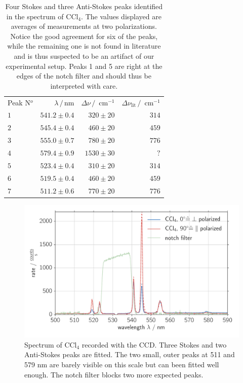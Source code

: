 \begin{table}[htpb]
    \centering
    \caption{
        Four Stokes and three Anti-Stokes peaks identified in the spectrum of CCl$_4$. The values displayed 
        are averages of measurements at two polarizations. Notice the good agreement for six of the peaks, 
        while the remaining one is not found in literature and is thus suspected to be an artifact of our 
        experimental setup. Peaks 1 and 5 are right at the edges of the notch filter and should thus be 
        interpreted with care. 
        }
    \label{tab:ccl4_peaks}
    \begin{tabular}{l r r r}
        \rowcolor{LightCyan} Peak N$^o$ & $\lambda \, / \, \text{nm}$ &
        $\Delta \nu \, / \, \text{ cm}^{-1}$ & 
        $\Delta \nu_\text{lit} \, / \, \text{ cm}^{-1}$ \\
        \cellcolor{LightCyan}$1$ & $541.2 \pm 0.4$ & $320 \pm 20$ & $314$   \\
        \cellcolor{LightCyan}$2$ & $545.4 \pm 0.4$ & $460 \pm 20$ & $459$   \\
        \cellcolor{LightCyan}$3$ & $555.0 \pm 0.7$ & $780 \pm 20$ & $776$   \\
        \cellcolor{LightCyan}$4$ & $579.4 \pm 0.9$ & $1530 \pm 30$ & $?$   \\
        \cellcolor{LightCyan}$5$ & $523.4 \pm 0.4$ & $310 \pm 20$ & $314$   \\
        \cellcolor{LightCyan}$6$ & $519.5 \pm 0.4$ & $460 \pm 20$ & $459$   \\
        \cellcolor{LightCyan}$7$ & $511.2 \pm 0.6$ & $770 \pm 20$ & $776$   
    \end{tabular}
\end{table}

\begin{figure}[htpb]
    \centering
    \includegraphics[width=0.8\linewidth]{analysis/figures/ccd_ccl4_spectra}
    \caption{
        Spectrum of CCl$_4$ recorded with the CCD. Three Stokes and two Anti-Stokes peaks are fitted. The two 
        small, outer peaks at 511 and 579 nm are barely visible on this scale but can been fitted well enough. 
        The notch filter blocks two more expected peaks. 
    }
    \label{fig:ccd_ccl4_spectra}
\end{figure}

